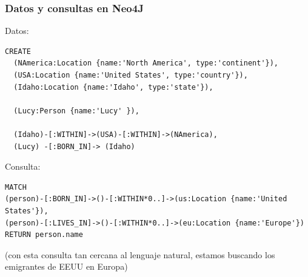 \documentclass[14pt]{beamer}
\begin{document}
\begin{frame}
  \frametitle{Datos y consultas en Neo4J}
\begin{block}{Datos:}
\begin{lstlisting}
CREATE
  (NAmerica:Location {name:'North America', type:'continent'}),
  (USA:Location {name:'United States', type:'country'}),
  (Idaho:Location {name:'Idaho', type:'state'}),

  (Lucy:Person {name:'Lucy' }),

  (Idaho)-[:WITHIN]->(USA)-[:WITHIN]->(NAmerica),
  (Lucy) -[:BORN_IN]-> (Idaho)
\end{lstlisting}
\end{block}

\framebreak

\begin{block}{Consulta:}
\begin{lstlisting}
MATCH
(person)-[:BORN_IN]->()-[:WITHIN*0..]->(us:Location {name:'United States'}),
(person)-[:LIVES_IN]->()-[:WITHIN*0..]->(eu:Location {name:'Europe'})
RETURN person.name
\end{lstlisting}
\end{block}

(con esta consulta tan cercana al lenguaje natural, estamos buscando los
emigrantes de EEUU en Europa)

\end{frame}




\end{document}
